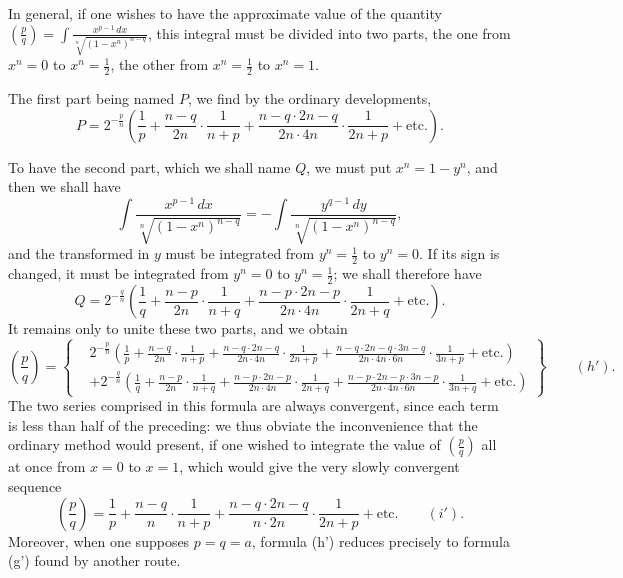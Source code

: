 \documentclass{article}
\begin{document}
In general, if one wishes to have the approximate value of the quantity $\left(\frac{p}{q}\right)=\displaystyle\int\frac{x^{p-1}\,dx}{\sqrt[n]{(1-x^{n})^{n-q}}}$, this integral must be divided into two parts, the one from $x^{n}=0$ to $x^{n}=\frac{1}{2}$, the other from $x^{n}=\frac{1}{2}$ to $x^{n}=1$.

The first part being named $P$, we find by the ordinary developments,
\[ P=2^{-\frac{p}{n}}\left(\frac{1}{p}+\frac{n-q}{2n}\cdot\frac{1}{n+p}+\frac{n-q\cdot 2n-q}{2n\cdot 4n}\cdot\frac{1}{2n+p}+\text{etc.}\right). \]

To have the second part, which we shall name $Q$, we must put $x^{n}=1-y^{n}$, and then we shall have
\[ \int\frac{x^{p-1}\,dx}{\sqrt[n]{(1-x^{n})^{n-q}}}=-\int\frac{y^{q-1}\,dy}{\sqrt[n]{(1-x^{n})^{n-q}}}, \]
and the transformed in $y$ must be integrated from $y^{n}=\frac{1}{2}$ to $y^{n}=0$. If its sign is changed, it must be integrated from $y^{n}=0$ to $y^{n}=\frac{1}{2}$; we shall therefore have
\[ Q=2^{-\frac{q}{n}}\left(\frac{1}{q}+\frac{n-p}{2n}\cdot\frac{1}{n+q}+\frac{n-p\cdot 2n-p}{2n\cdot 4n}\cdot\frac{1}{2n+q}+\text{etc.}\right). \]
It remains only to unite these two parts, and we obtain
\[ \left(\frac{p}{q}\right)=\left\{\begin{aligned} &2^{-\frac{p}{n}}\left(\frac{1}{p}+\frac{n-q}{2n}\cdot\frac{1}{n+p}+\frac{n-q\cdot 2n-q}{2n\cdot 4n}\cdot\frac{1}{2n+p}+\frac{n-q\cdot 2n-q\cdot 3n-q}{2n\cdot 4n\cdot 6n}\cdot\frac{1}{3n+p}+\text{etc.}\right)\\ &+2^{-\frac{q}{n}}\left(\frac{1}{q}+\frac{n-p}{2n}\cdot\frac{1}{n+q}+\frac{n-p\cdot 2n-p}{2n\cdot 4n}\cdot\frac{1}{2n+q}+\frac{n-p\cdot 2n-p\cdot 3n-p}{2n\cdot 4n\cdot 6n}\cdot\frac{1}{3n+q}+\text{etc.}\right) \end{aligned}\right\}\qquad(h'). \]
The two series comprised in this formula are always convergent, since each term is less than half of the preceding: we thus obviate the inconvenience that the ordinary method would present, if one wished to integrate the value of $\left(\frac{p}{q}\right)$ all at once from $x=0$ to $x=1$, which would give the very slowly convergent sequence
\[ \left(\frac{p}{q}\right)=\frac{1}{p}+\frac{n-q}{n}\cdot\frac{1}{n+p}+\frac{n-q\cdot 2n-q}{n\cdot 2n}\cdot\frac{1}{2n+p}+\text{etc.}\qquad(i'). \]
Moreover, when one supposes $p=q=a$, formula (h') reduces precisely to formula (g') found by another route.
\end{document}
